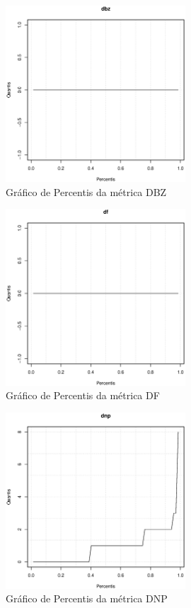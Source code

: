 \begin{apendicesenv}
\newpage

\begin{figure}[h]
  \centering
  \includegraphics[width=0.6\textwidth]
      {dados/linux/dbz.eps}
  \caption{Gráfico de Percentis da métrica DBZ}
\end{figure}

\begin{figure}[h]
  \centering
  \includegraphics[width=0.6\textwidth]
      {dados/linux/df.eps}
  \caption{Gráfico de Percentis da métrica DF}
\end{figure}

\newpage

\begin{figure}[h]
  \centering
  \includegraphics[width=0.6\textwidth]
      {dados/linux/dnp.eps}
  \caption{Gráfico de Percentis da métrica DNP}
  \label{graphic:dnp}
\end{figure}


\end{apendicesenv}
